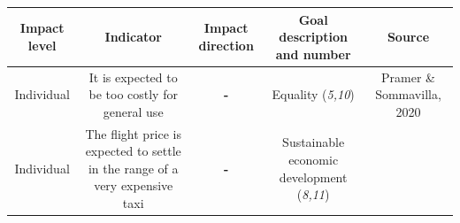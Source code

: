\documentclass[
]{book}
\begin{document}
\begin{longtable}[]{@{}ccccc@{}}
\toprule
\begin{minipage}[b]{0.17\columnwidth}\centering
Impact level\strut
\end{minipage} & \begin{minipage}[b]{0.16\columnwidth}\centering
Indicator\strut
\end{minipage} & \begin{minipage}[b]{0.17\columnwidth}\centering
Impact direction\strut
\end{minipage} & \begin{minipage}[b]{0.17\columnwidth}\centering
Goal description and number\strut
\end{minipage} & \begin{minipage}[b]{0.17\columnwidth}\centering
Source\strut
\end{minipage}\tabularnewline
\midrule
\endhead
\begin{minipage}[t]{0.17\columnwidth}\centering
Individual\strut
\end{minipage} & \begin{minipage}[t]{0.16\columnwidth}\centering
It is expected to be too costly for general use\strut
\end{minipage} & \begin{minipage}[t]{0.17\columnwidth}\centering
\textbf{-}\strut
\end{minipage} & \begin{minipage}[t]{0.17\columnwidth}\centering
Equality (\emph{5,10})\strut
\end{minipage} & \begin{minipage}[t]{0.17\columnwidth}\centering
Pramer \& Sommavilla, 2020\strut
\end{minipage}\tabularnewline
\begin{minipage}[t]{0.17\columnwidth}\centering
Individual\strut
\end{minipage} & \begin{minipage}[t]{0.16\columnwidth}\centering
The flight price is expected to settle in the range of a very expensive taxi\strut
\end{minipage} & \begin{minipage}[t]{0.17\columnwidth}\centering
\textbf{-}\strut
\end{minipage} & \begin{minipage}[t]{0.17\columnwidth}\centering
Sustainable economic development (\emph{8,11})\strut
\end{minipage} & \begin{minipage}[t]{0.17\columnwidth}\centering

\end{minipage}
\end{longtable}
\end{document}
